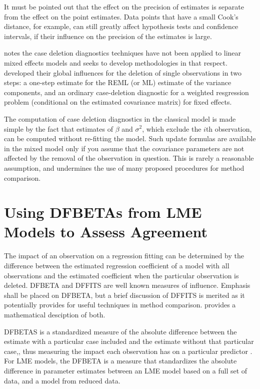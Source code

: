 \documentclass[]{report}
\begin{document}
	
	
	It must be pointed out that the effect on the precision of estimates is separate from the effect on the point estimates. Data points that have a small Cook's distance, for example, can still greatly affect hypothesis tests and confidence intervals, if their 
	influence on the precision of the estimates is large.	
	
	\citet{Christensen} notes the case deletion diagnostics techniques have not been applied to linear mixed effects models and seeks to develop methodologies in that respect. \citet{Christensen} developed their global influences for the deletion of single observations in two steps: a one-step estimate for the REML (or ML) estimate of the variance components, and an ordinary case-deletion diagnostic for a weighted resgression problem (conditional on the estimated covariance matrix) for fixed effects.
	
	The computation of case deletion diagnostics in the classical model is made simple by the fact that estimates of $\beta$ and $\sigma^2$, which exclude the $i$th observation, can be computed without re-fitting the model. Such update formulas are available in the mixed model only if you assume that the covariance parameters are not affected by the removal of the observation in question. This is rarely a reasonable assumption, and undermines the use of many proposed procedures for method comparison.



\section{Using DFBETAs from LME Models to Assess Agreement}

The impact of an observation on a regression fitting can be determined by the difference between the estimated regression coefficient of a model with all observations and the estimated coefficient when the particular observation is deleted. DFBETA and DFFITS are well known measures of influence. Emphasis shall be placed on DFBETA, but a brief discussion of DFFITS is merited as it potentially provides for useful techniques in method comparison. \citet{schabenberger} provides a mathematical desciption of both.

DFBETAS is a standardized measure of the absolute difference between the estimate with a particular
case included and the estimate without that particular case,, thus measuring the impact each observation has on a particular predictor \citep{belsley2005}. For LME models, the DFBETA is a measure that standardizes the absolute difference in parameter estimates between an LME model based on a full set of data, and a model from reduced data.
\end{document}
